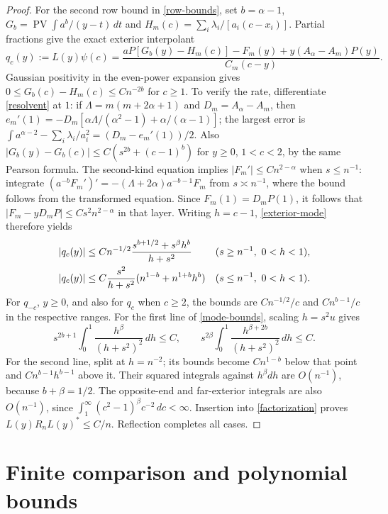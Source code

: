 \documentclass[a4paper,11pt]{amsart}
\theoremstyle{remark}\newtheorem{remark}[theorem]{Remark}
\newcommand{\PV}{\operatorname{PV}}
\newcommand{\dd}{\,d}
\begin{document}
\begin{proof}
For the second row bound in \eqref{row-bounds}, set
$b=\alpha-1$, $G_b=\PV\int a^b/(y-t)\dd t$ and
$H_m(c)=\sum_i\lambda_i/[a_i(c-x_i)]$.
Partial fractions give the exact exterior interpolant
\begin{equation}\label{exterior-mode}
 q_c(y):=L(y)\psi(c)
 =\frac{aP[G_b(y)-H_m(c)]-F_m(y)+y(A_\alpha-A_m)P(y)}{C_m(c-y)}.
\end{equation}
Gaussian positivity in the even-power expansion gives
$0\le G_b(c)-H_m(c)\le Cn^{-2b}$ for $c\ge1$.
To verify the rate, differentiate \eqref{resolvent} at $1$:
if $\Lambda=m(m+2\alpha+1)$ and $D_m=A_\alpha-A_m$, then
$e_m'(1)=-D_m[\alpha\Lambda/(\alpha^2-1)+\alpha/(\alpha-1)]$;
the largest error is
$\int a^{\alpha-2}-\sum_i\lambda_i/a_i^2=(D_m-e_m'(1))/2$.
Also $|G_b(y)-G_b(c)|\le C(s^{2b}+(c-1)^b)$ for
$y\ge0$, $1<c<2$, by the same Pearson formula.
The second-kind equation implies
$|F_m'|\le Cn^{2-\alpha}$ when $s\le n^{-1}$: integrate
$(a^{-b}F_m')'=-(\Lambda+2\alpha)a^{-b-1}F_m$
from $s\asymp n^{-1}$, where the bound follows from the transformed
equation. Since $F_m(1)=D_mP(1)$, it follows that
$|F_m-yD_mP|\le Cs^2n^{2-\alpha}$ in that layer.
Writing $h=c-1$, \eqref{exterior-mode} therefore yields
\begin{align}\label{mode-bounds}
 |q_c(y)|&\le Cn^{-1/2}
 \frac{s^{b+1/2}+s^\beta h^b}{h+s^2}&& (s\ge n^{-1},\ 0<h<1),\notag\\
 |q_c(y)|&\le C\frac{s^2}{h+s^2}
       (n^{1-b}+n^{1+b}h^b)&& (s\le n^{-1},\ 0<h<1).
\end{align}
For $q_{-c}$, $y\ge0$, and also for $q_c$ when $c\ge2$, the bounds
are $Cn^{-1/2}/c$ and $Cn^{b-1}/c$ in the respective ranges.
For the first line of \eqref{mode-bounds}, scaling $h=s^2u$ gives
\begin{equation*}
 s^{2b+1}\int_0^1\frac{h^\beta}{(h+s^2)^2}\dd h\le C,
 \qquad s^{2\beta}\int_0^1\frac{h^{\beta+2b}}{(h+s^2)^2}\dd h\le C.
\end{equation*}
For the second line, split at $h=n^{-2}$; its bounds become
$Cn^{1-b}$ below that point and $Cn^{b-1}h^{b-1}$ above it.
Their squared integrals against $h^\beta dh$ are $O(n^{-1})$,
because $b+\beta=1/2$. The opposite-end and far-exterior integrals
are also $O(n^{-1})$, since
$\int_1^\infty(c^2-1)^\beta c^{-2}\dd c<\infty$.
Insertion into \eqref{factorization} proves
$L(y)R_nL(y)^*\le C/n$. Reflection completes all cases.
\end{proof}

\section{Finite comparison and polynomial bounds}
\end{document}
